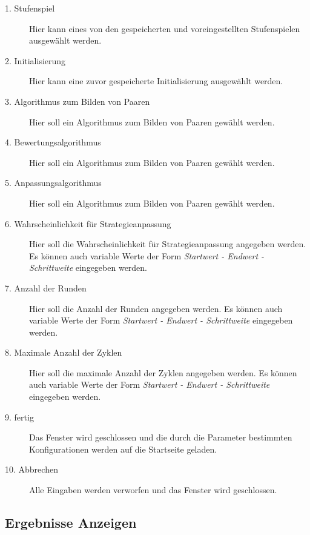 \begin{description}

\item[1. Stufenspiel] Hier kann eines von den gespeicherten und voreingestellten Stufenspielen ausgewählt werden.

\item[2. Initialisierung] Hier kann eine zuvor gespeicherte Initialisierung ausgewählt werden. 

\item[3. Algorithmus zum Bilden von Paaren] Hier soll ein Algorithmus zum Bilden von Paaren gewählt werden. 

\item[4. Bewertungsalgorithmus] Hier soll ein Algorithmus zum Bilden von Paaren gewählt werden.

\item[5. Anpassungsalgorithmus] Hier soll ein Algorithmus zum Bilden von Paaren gewählt werden.

\item[6. Wahrscheinlichkeit für Strategieanpassung] Hier soll die Wahrscheinlichkeit für Strategieanpassung angegeben werden. Es können auch variable Werte der Form \textit{Startwert - Endwert - Schrittweite} eingegeben werden.

\item[7. Anzahl der Runden] Hier soll die Anzahl der Runden angegeben werden. Es können auch variable Werte der Form \textit{Startwert - Endwert - Schrittweite} eingegeben werden.

\item[8. Maximale Anzahl der Zyklen] Hier soll die maximale Anzahl der Zyklen angegeben werden. Es können auch variable Werte der Form \textit{Startwert - Endwert - Schrittweite} eingegeben werden.

\item[9. fertig] Das Fenster wird geschlossen und die durch die Parameter bestimmten Konfigurationen werden auf die Startseite geladen.

\item[10. Abbrechen] Alle Eingaben werden verworfen und das Fenster wird geschlossen.


\end{description}

\pagebreak



\subsection{Ergebnisse Anzeigen}

